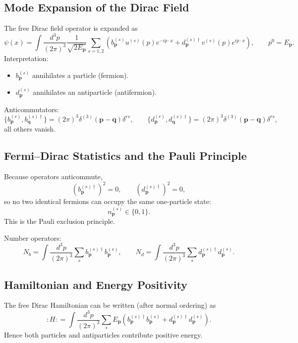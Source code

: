 \subsection{Mode Expansion of the Dirac Field}
The free Dirac field operator is expanded as
\begin{equation}
\psi(x)
=
\int \frac{d^3p}{(2\pi)^3}\frac{1}{\sqrt{2E_{\mathbf{p}}}}
\sum_{s=1,2}
\left(
b_{\mathbf{p}}^{(s)}u^{(s)}(p)e^{-ip\cdot x}
+
d_{\mathbf{p}}^{(s)\dagger}v^{(s)}(p)e^{ip\cdot x}
\right),
\qquad p^0=E_{\mathbf{p}}.
\end{equation}
Interpretation:
\begin{itemize}
\item $b_{\mathbf{p}}^{(s)}$ annihilates a particle (fermion).
\item $d_{\mathbf{p}}^{(s)}$ annihilates an antiparticle (antifermion).
\end{itemize}

Anticommutators:
\begin{equation}
\{b_{\mathbf{p}}^{(r)},b_{\mathbf{q}}^{(s)\dagger}\}
=
(2\pi)^3\delta^{(3)}(\mathbf{p}-\mathbf{q})\delta^{rs},
\qquad
\{d_{\mathbf{p}}^{(r)},d_{\mathbf{q}}^{(s)\dagger}\}
=
(2\pi)^3\delta^{(3)}(\mathbf{p}-\mathbf{q})\delta^{rs},
\end{equation}
all others vanish.

\subsection{Fermi--Dirac Statistics and the Pauli Principle}
Because operators anticommute,
\begin{equation}
\left(b_{\mathbf{p}}^{(s)\dagger}\right)^2=0,
\qquad
\left(d_{\mathbf{p}}^{(s)\dagger}\right)^2=0,
\end{equation}
so no two identical fermions can occupy the same one-particle state:
\begin{equation}
n_{\mathbf{p}}^{(s)}\in\{0,1\}.
\end{equation}
This is the Pauli exclusion principle.

Number operators:
\begin{equation}
N_b=\int\frac{d^3p}{(2\pi)^3}\sum_s b_{\mathbf{p}}^{(s)\dagger}b_{\mathbf{p}}^{(s)},
\qquad
N_d=\int\frac{d^3p}{(2\pi)^3}\sum_s d_{\mathbf{p}}^{(s)\dagger}d_{\mathbf{p}}^{(s)}.
\end{equation}

\subsection{Hamiltonian and Energy Positivity}
The free Dirac Hamiltonian can be written (after normal ordering) as
\begin{equation}
:H:
=
\int\frac{d^3p}{(2\pi)^3}\sum_s E_{\mathbf{p}}
\left(
b_{\mathbf{p}}^{(s)\dagger}b_{\mathbf{p}}^{(s)}
+
d_{\mathbf{p}}^{(s)\dagger}d_{\mathbf{p}}^{(s)}
\right).
\end{equation}
Hence both particles and antiparticles contribute positive energy.

